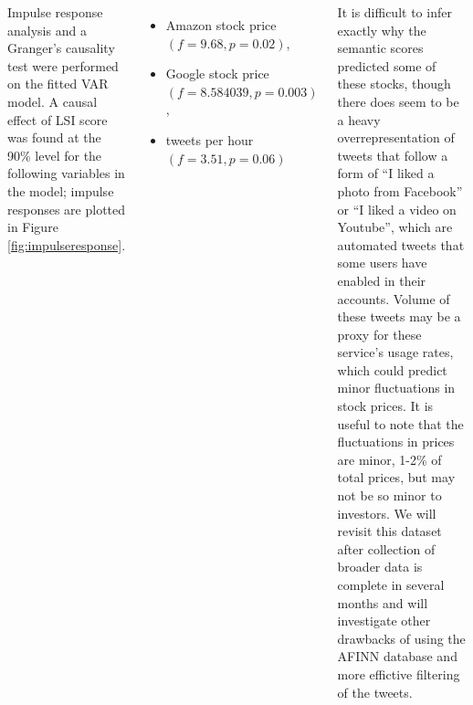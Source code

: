\documentclass[17pt, a1paper, portrait, margin=0mm, innermargin=1mm,
     blockverticalspace=3mm, colspace=5mm, subcolspace=5mm]{tikzposter} %
\begin{document}
\begin{columns}
{   %
   Impulse response analysis and a Granger's causality test were performed on the
   fitted VAR model. A causal effect of LSI score was found at the 90\% level for the following
   variables in the model; impulse responses are plotted in Figure \ref{fig:impulseresponse}. 
   \begin{itemize}
   \item Amazon stock price $(f = 9.68, p = 0.02)$,
   \item Google stock price $(f = 8.584039, p = 0.003)$, 
   \item tweets per hour $(f = 3.51, p = 0.06)$ 
   \end{itemize}

   It is difficult to infer exactly why the semantic scores predicted some of
   these stocks, though there does seem to be a heavy overrepresentation of
   tweets that follow a form of ``I liked a photo from Facebook'' or ``I liked
   a video on Youtube'', which are automated tweets that some users have
   enabled in their accounts. Volume of these tweets may be a proxy for
   these service's usage rates, which could predict minor fluctuations in stock
   prices. It is useful to note that the fluctuations in prices are minor,
   1-2\% of total prices, but may not be so minor to investors. We will revisit
   this dataset after collection of broader data is complete in several months
   and will investigate other drawbacks of using the AFINN database and
   more effictive filtering of the tweets.
   }


 \end{columns}
\end{document}
